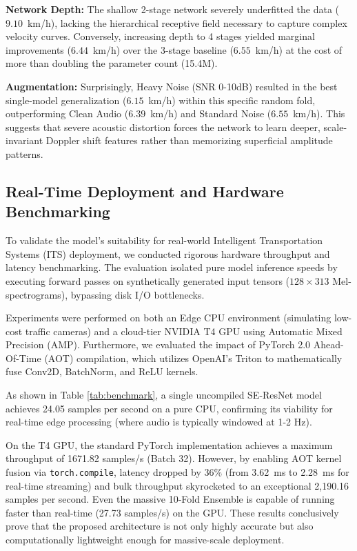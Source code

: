 \documentclass[conference]{IEEEtran}
\begin{document}
\textbf{Network Depth:} The shallow 2-stage network severely underfitted the data ($9.10$~km/h), lacking the hierarchical receptive field necessary to capture complex velocity curves. Conversely, increasing depth to 4 stages yielded marginal improvements ($6.44$~km/h) over the 3-stage baseline ($6.55$~km/h) at the cost of more than doubling the parameter count (15.4M).

\textbf{Augmentation:} Surprisingly, Heavy Noise (SNR 0-10dB) resulted in the best single-model generalization ($6.15$~km/h) within this specific random fold, outperforming Clean Audio ($6.39$~km/h) and Standard Noise ($6.55$~km/h). This suggests that severe acoustic distortion forces the network to learn deeper, scale-invariant Doppler shift features rather than memorizing superficial amplitude patterns.

\subsection{Real-Time Deployment and Hardware Benchmarking}
To validate the model's suitability for real-world Intelligent Transportation Systems (ITS) deployment, we conducted rigorous hardware throughput and latency benchmarking. The evaluation isolated pure model inference speeds by executing forward passes on synthetically generated input tensors ($128 \times 313$ Mel-spectrograms), bypassing disk I/O bottlenecks. 

Experiments were performed on both an Edge CPU environment (simulating low-cost traffic cameras) and a cloud-tier NVIDIA T4 GPU using Automatic Mixed Precision (AMP). Furthermore, we evaluated the impact of PyTorch 2.0 Ahead-Of-Time (AOT) compilation, which utilizes OpenAI's Triton to mathematically fuse Conv2D, BatchNorm, and ReLU kernels.



As shown in Table \ref{tab:benchmark}, a single uncompiled SE-ResNet model achieves 24.05 samples per second on a pure CPU, confirming its viability for real-time edge processing (where audio is typically windowed at 1-2 Hz). 

On the T4 GPU, the standard PyTorch implementation achieves a maximum throughput of 1671.82 samples/s (Batch 32). However, by enabling AOT kernel fusion via \texttt{torch.compile}, latency dropped by $36\%$ (from 3.62~ms to 2.28~ms for real-time streaming) and bulk throughput skyrocketed to an exceptional 2,190.16 samples per second. Even the massive 10-Fold Ensemble is capable of running faster than real-time (27.73 samples/s) on the GPU. These results conclusively prove that the proposed architecture is not only highly accurate but also computationally lightweight enough for massive-scale deployment.
\end{document}
